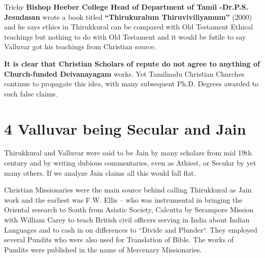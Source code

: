 Trichy \textbf{Bishop Heeber College Head of Department of Tamil -\break Dr.P.S. Jesudasan} wrote a book titled \textbf{“Thirukuralum Thiruvi\-viliyamum”} (2000) and he says ethics in Thirukkural can be compared with Old Testament Ethical teachings but nothing to do with Old Testament and it would be futile to say Valluvar got his teachings from Christian source.

\textbf{It is clear that Christian Scholars of repute do not agree to anything of Church-funded Deivanayagam} works. Yet Tamilnadu Christian Churches continue to propagate this idea, with many subsequent Ph.D. Degrees awarded to such false claims.


\section*{4 Valluvar being Secular and Jain}

Thirukkural and Valluvar were said to be Jain by many scholars from mid 19th century and by writing dubious commentaries, even as Athiest, or Secular by yet many others. If we analyze Jain claims all this would fall flat.

Christian Missionaries were the main source behind calling Thirukkural as Jain work and the earliest was F.W. Ellis – who was instrumental in bringing the Oriental research to South from Asiatic Society, Calcutta by Serampore Mission with William Carey to teach British civil officers serving in India about Indian Languages and to cash in on differences to “Divide and Plunder“. They employed several Pundits who were also used for Translation of Bible. The works of Pundits were published in the name of Mercenary Missionaries.


